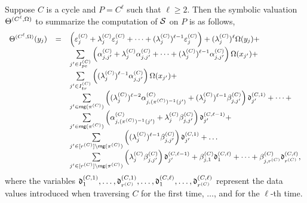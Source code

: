 \begin{proposition}\label{prop-sum-cycle}
Suppose $C$ is a cycle and $P=C^{\ell}$ such that $\ell \ge 2$. Then the symbolic valuation $\Theta^{(C^\ell,\Omega)}$ to summarize the computation of ${\mathcal{S} }$ on $P$ is as follows,
\[
\small
\begin{array}{l c l}
\sumf^{(C^\ell,\initval)}(y_j)  & = & \left(\cste^{(C)}_{j} + \cstl^{(C)}_{j} \cste^{(C)}_{j}+ \dots +(\cstl^{(C)}_{j})^{\ell-1} \cste^{(C)}_{j}\right) + (\cstl^{(C)}_{j})^\ell \initval(y_j) + \\
& & \sum \limits_{j' \in I^{(C)}_{pe}} \left(\csta^{(C)}_{j,j'}+\cstl^{(C)}_{j}\csta^{(C)}_{j,j'} + \dots +(\cstl^{(C)}_{j})^{\ell-1}  \csta^{(C)}_{j,j'} \right) \initval(x_{j'}) + \\
%
& & \sum \limits_{j' \in I^{(C)}_{tr}} \left((\cstl^{(C)}_{j})^{\ell-1} \csta^{(C)}_{j,j'} \right) \initval(x_{j'}) +  \\
%
& & \sum \limits_{j' \in \rng(\pi^{(C)})} \left( (\cstl^{(C)}_{j})^{\ell-2} \csta^{(C)}_{j, (\pi^{(C)})^{-1}(j')} +(\cstl^{(C)}_{j})^{\ell-1}\cstb^{(C)}_{j,j'} \right) \vard^{(C,1)}_{j'} + \dots  +\\
%
& & \sum \limits_{j' \in \rng(\pi^{(C)})} \left( \csta^{(C)}_{j, (\pi^{(C)})^{-1}(j')}+ \cstl^{(C)}_{j} \cstb^{(C)}_{j,j'} \right) \vard^{(C,\ell-1)}_{j'} + \\
%
& & \sum \limits_{j' \in [r^{(C)}] \setminus \rng(\pi^{(C)})} \left((\cstl^{(C)}_{j})^{\ell-1} \cstb^{(C)}_{j,j'} \right) \vard^{(C,1)}_{j'} + \dots  \\
%
%
& &  \sum \limits_{j' \in [r^{(C)}] \setminus \rng(\pi^{(C)})}  \left(\cstl^{(C)}_{j} \cstb^{(C)}_{j,j'} \right) \vard^{(C,\ell-1)}_{j'} + \cstb^{(C)}_{j, 1} \vard^{(C,\ell)}_{1} + \dots + \cstb^{(C)}_{j,r^{(C)}} \vard^{(C,\ell)}_{r^{(C)}},
\end{array} 
\]
where the variables $\mathfrak{d}^{(C,1)}_{1},\dots, \mathfrak{d}^{(C,1)}_{r^{(C)}},\dots, \mathfrak{d}^{(C,\ell)}_{1},\dots, \mathfrak{d}^{(C,\ell)}_{r^{(C)}}$
 represent the data values introduced when traversing $C$ for the first time, $\dots$, and for the $\ell$-th time.
\end{proposition}

